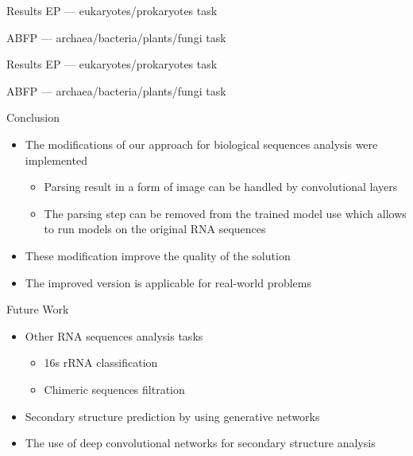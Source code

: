 \documentclass[xcolor=table]{beamer}
\begin{document}
\begin{frame}{Results}
EP --- eukaryotes/prokaryotes task

ABFP --- archaea/bacteria/plants/fungi task


\end{frame}

\begin{frame}{Results}
EP --- eukaryotes/prokaryotes task

ABFP --- archaea/bacteria/plants/fungi task


\end{frame}

\begin{frame}{Conclusion}
\begin{itemize}
    \item The modifications of our approach for biological sequences analysis were implemented
    \begin{itemize}
        \item Parsing result in a form of image can be handled by convolutional layers
        \item The parsing step can be removed from the trained model use which allows to run models on the original RNA sequences        
    \end{itemize}
    \item These modification improve the quality of the solution
    \item The improved version is applicable for real-world problems
\end{itemize}
\end{frame}

\begin{frame}{Future Work}
\begin{itemize}
    \item Other RNA sequences analysis tasks
    \begin{itemize}
        \item 16s rRNA classification
        \item Chimeric sequences filtration
    \end{itemize}
    \item Secondary structure prediction by using generative networks
    \item The use of deep convolutional networks for secondary structure analysis
\end{itemize}

\end{frame}
\end{document}
